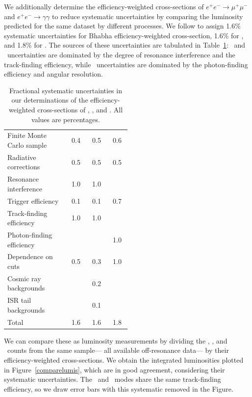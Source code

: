 \documentclass{cornell}
\begin{document}
We additionally determine the efficiency-weighted cross-sections of $e^+e^- \to
\mu^+\mu^-$ and $e^+e^- \to \gamma\gamma$ to reduce systematic
uncertainties by comparing the luminosity predicted for the same
dataset by different processes.  We follow \cite{oldlumi} to assign
1.6\% systematic uncertainties for Bhabha efficiency-weighted cross-section,
1.6\% for \mumu, and 1.8\% for \gamgam.  The sources of these
uncertainties are tabulated in Table~\ref{tab:lumisyst}: \ee\ and
\mumu\ uncertainties are dominated by the degree of resonance
interference and the track-finding efficiency, while \gamgam\
uncertainties are dominated by the photon-finding efficiency and
angular resolution.

\begin{table}
  \caption{\label{tab:lumisyst} Fractional systematic uncertainties in
  our determinations of the efficiency-weighted cross-sections of \ee, \mumu,
  and \gamgam.  All values are percentages.}
  \begin{center}
    \begin{tabular}{p{0.5\linewidth} | c c c}
      \hline\hline
      & \ee & \mumu & \gamgam \\\hline
      Finite Monte Carlo sample & 0.4 & 0.5 & 0.6 \\
      Radiative corrections & 0.5 & 0.5 & 0.5 \\
      Resonance interference & 1.0 & 1.0 & \\
      Trigger efficiency & 0.1 & 0.1 & 0.7 \\
      Track-finding efficiency & 1.0 & 1.0 & \\
      Photon-finding efficiency & & & 1.0 \\
      Dependence on cuts & 0.5 & 0.3 & 1.0 \\
      Cosmic ray backgrounds & & 0.2 & \\
      ISR tail backgrounds & & 0.1 & \\\hline
      Total & 1.6 & 1.6 & 1.8 \\\hline\hline
    \end{tabular}
  \end{center}
\end{table}

We can compare these as luminosity measurements by dividing the \ee,
\mumu, and \gamgam\ counts from the same sample--- all available
off-resonance data--- by their efficiency-weighted cross-sections.  We obtain
the integrated luminosities plotted in Figure~\ref{comparelumis},
which are in good agreement, considering their systematic
uncertainties.  The \ee\ and \mumu\ modes share the same track-finding
efficiency, so we draw error bars with this systematic removed in the
Figure.
\end{document}
